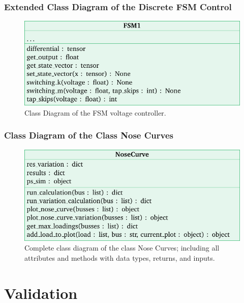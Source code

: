 \subsection{Extended Class Diagram of the Discrete FSM Control}

\begin{figure}[H]
    \centering
    \includegraphics{tikz_graphics/images/class_diagram_fsm_control.pdf}
    \caption{Class Diagram of the \acs{FSM} voltage controller.}
\end{figure}

\subsection{Class Diagram of the Class Nose Curves}
\label{app:nose-curve}

\begin{figure}[H]
    \centering
    \includegraphics[width=12cm]{tikz_graphics/images/class_diagram_nosecurve_complete.pdf}
    \caption{Complete class diagram of the class Nose Curves; including all attributes and methods with data types, returns, and inputs.}
    \label{fig:class-diagram-nose-curves}
\end{figure}

\chapter{Validation}
\label{app:validation}

